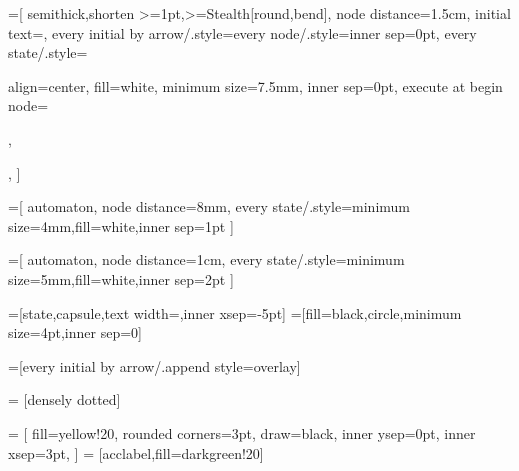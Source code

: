 \usetikzlibrary{automata}
\usetikzlibrary{arrows.meta}
\usetikzlibrary{bending}
\usetikzlibrary{shapes.callouts}
\usetikzlibrary{quotes}
\usetikzlibrary{positioning}
\usetikzlibrary{calc}
\usetikzlibrary{extshapes}
\usetikzlibrary{matrix}

\def\accsize{6pt}


=[
  semithick,shorten >=1pt,>={Stealth[round,bend]},
  node distance=1.5cm,
  initial text=,
  every initial by arrow/.style={every node/.style={inner sep=0pt}},
  every state/.style={
    align=center,
    fill=white,
    minimum size=7.5mm,
    inner sep=0pt,
    execute at begin node=\strut,
  },%
]

=[
  automaton,
  node distance=8mm,
  every state/.style={minimum size=4mm,fill=white,inner sep=1pt}
]

=[
  automaton,
  node distance=1cm,
  every state/.style={minimum size=5mm,fill=white,inner sep=2pt}
]

=[state,capsule,text width=,inner xsep=-5pt]
=[fill=black,circle,minimum size=4pt,inner sep=0]

\makeatletter
{}
\makeatother

=[every initial by arrow/.append style={overlay}]

 = [densely dotted]

 = [
  fill=yellow!20,
  rounded corners=3pt,
  draw=black,
  inner ysep=0pt,
  inner xsep=3pt,
]
 = [acclabel,fill=darkgreen!20]

